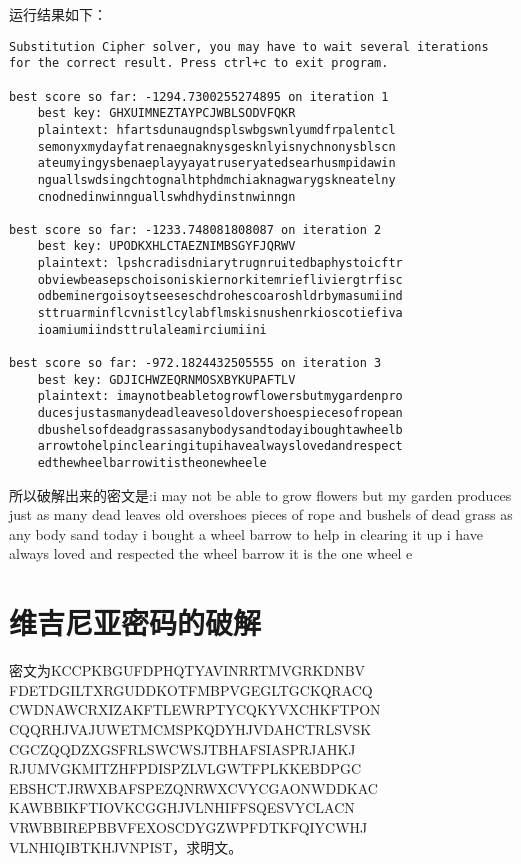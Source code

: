 \documentclass{article}
\begin{document}
运行结果如下：
\begin{lstlisting}[title=result, frame=shadowbox]
Substitution Cipher solver, you may have to wait several iterations
for the correct result. Press ctrl+c to exit program.

best score so far: -1294.7300255274895 on iteration 1
    best key: GHXUIMNEZTAYPCJWBLSODVFQKR
    plaintext: hfartsdunaugndsplswbgswnlyumdfrpalentcl
    semonyxmydayfatrenaegnaknysgesknlyisnychnonysblscn
    ateumyingysbenaeplayyayatruseryatedsearhusmpidawin
    nguallswdsingchtognalhtphdmchiaknagwarygskneatelny
    cnodnedinwinnguallswhdhydinstnwinngn

best score so far: -1233.748081808087 on iteration 2
    best key: UPODKXHLCTAEZNIMBSGYFJQRWV
    plaintext: lpshcradisdniarytrugnruitedbaphystoicftr
    obviewbeasepschoisoniskiernorkitemriefliviergtrfisc
    odbeminergoisoytseeseschdrohescoaroshldrbymasumiind
    sttruarminflcvnistlcylabflmskisnushenrkioscotiefiva
    ioamiumiindsttrulaleamirciumiini

best score so far: -972.1824432505555 on iteration 3
    best key: GDJICHWZEQRNMOSXBYKUPAFTLV
    plaintext: imaynotbeabletogrowflowersbutmygardenpro
    ducesjustasmanydeadleavesoldovershoespiecesofropean
    dbushelsofdeadgrassasanybodysandtodayiboughtawheelb
    arrowtohelpinclearingitupihavealwayslovedandrespect
    edthewheelbarrowitistheonewheele
\end{lstlisting}

所以破解出来的密文是:i may not be able to grow flowers but my garden produces just as many dead leaves old overshoes pieces of rope and bushels of dead grass as any body sand today i bought a wheel barrow to help in clearing it up i have always loved and respected the wheel barrow it is the one wheel e

\section*{维吉尼亚密码的破解}

密文为KCCPKBGUFDPHQTYAVINRRTMVGRKDNBV\\
FDETDGILTXRGUDDKOTFMBPVGEGLTGCKQRACQ\\
CWDNAWCRXIZAKFTLEWRPTYCQKYVXCHKFTPON\\
CQQRHJVAJUWETMCMSPKQDYHJVDAHCTRLSVSK\\
CGCZQQDZXGSFRLSWCWSJTBHAFSIASPRJAHKJ\\
RJUMVGKMITZHFPDISPZLVLGWTFPLKKEBDPGC\\
EBSHCTJRWXBAFSPEZQNRWXCVYCGAONWDDKAC\\
KAWBBIKFTIOVKCGGHJVLNHIFFSQESVYCLACN\\
VRWBBIREPBBVFEXOSCDYGZWPFDTKFQIYCWHJ\\
VLNHIQIBTKHJVNPIST，求明文。
\end{document}
